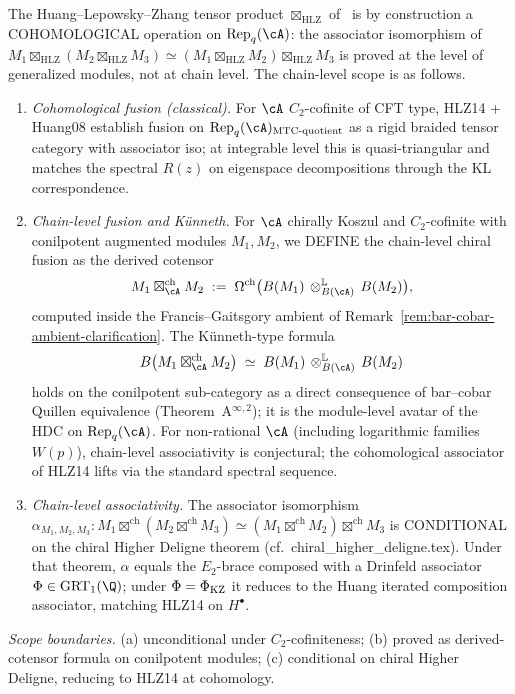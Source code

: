 \begin{remark}
\label{rem:chiral-fusion-chain-level}
%
%
%
The Huang--Lepowsky--Zhang tensor product $\boxtimes_{\mathrm{HLZ}}$
of~\cite{HLZ14,Hua08} is by construction a COHOMOLOGICAL operation on
$\Repq(\cA)$: the associator isomorphism of
$M_1 \boxtimes_{\mathrm{HLZ}} (M_2 \boxtimes_{\mathrm{HLZ}} M_3)
\simeq (M_1 \boxtimes_{\mathrm{HLZ}} M_2) \boxtimes_{\mathrm{HLZ}} M_3$
is proved at the level of generalized modules, not at chain level. The
chain-level scope is as follows.
\begin{enumerate}
\item[(a)] \emph{Cohomological fusion (classical).} For $\cA$
 $C_2$-cofinite of CFT type, HLZ14 + Huang08 establish fusion on
 $\Repq(\cA)_{\mathrm{MTC}\text{-quotient}}$ as a rigid braided tensor
 category with associator iso; at integrable level this is
 quasi-triangular and matches the spectral $R(z)$ on eigenspace
 decompositions through the KL correspondence.
\item[(b)] \emph{Chain-level fusion and K\"unneth.} For $\cA$ chirally
 Koszul and $C_2$-cofinite with conilpotent augmented modules
 $M_1, M_2$, we DEFINE the chain-level chiral fusion as the derived
 cotensor
 \[
 M_1 \boxtimes^{\mathrm{ch}}_\cA M_2
 \;:=\; \Omega^{\mathrm{ch}}\bigl(B(M_1) \,\otimes_{B(\cA)}^{\mathbb{L}}\, B(M_2)\bigr),
 \]
 computed inside the Francis--Gaitsgory ambient of
 Remark~\ref{rem:bar-cobar-ambient-clarification}. The
 K\"unneth-type formula
 \[
 B\bigl(M_1 \boxtimes^{\mathrm{ch}}_\cA M_2\bigr)
 \;\simeq\;
 B(M_1) \,\otimes_{B(\cA)}^{\mathbb{L}}\, B(M_2)
 \]
 holds on the conilpotent sub-category as a direct consequence of
 bar--cobar Quillen equivalence
 (Theorem~A${}^{\infty,2}$); it is the module-level avatar of the
 HDC on $\Repq(\cA)$. For non-rational $\cA$ (including logarithmic
 families $W(p)$), chain-level associativity is conjectural; the
 cohomological associator of HLZ14 lifts via the standard spectral
 sequence.
\item[(c)] \emph{Chain-level associativity.} The associator
 isomorphism
 $\alpha_{M_1,M_2,M_3}\colon
 M_1 \boxtimes^{\mathrm{ch}} (M_2 \boxtimes^{\mathrm{ch}} M_3)
 \simeq (M_1 \boxtimes^{\mathrm{ch}} M_2) \boxtimes^{\mathrm{ch}} M_3$
 is CONDITIONAL on the chiral Higher Deligne theorem
 (cf.~\textsf{chiral\_higher\_deligne.tex}).
 Under that theorem, $\alpha$ equals the $E_2$-brace composed with a
 Drinfeld associator $\Phi \in \GRT_1(\Q)$; under $\Phi = \Phi_{\mathrm{KZ}}$
 it reduces to the Huang iterated composition associator, matching
 HLZ14 on $H^\bullet$.
\end{enumerate}
\emph{Scope boundaries.} (a) unconditional under $C_2$-cofiniteness;
(b) proved as derived-cotensor formula on conilpotent modules; (c)
conditional on chiral Higher Deligne, reducing to HLZ14 at
cohomology.
\end{remark}


